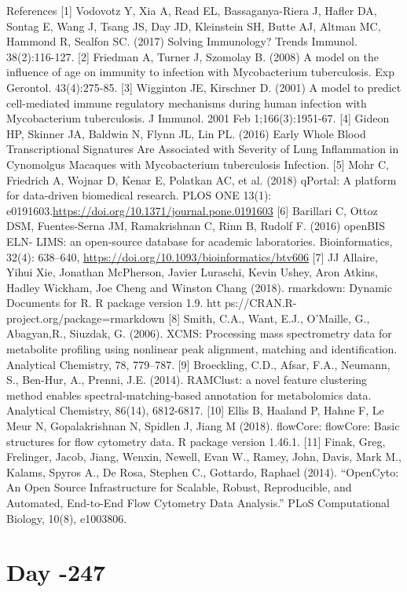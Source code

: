\documentclass[]{book}
\begin{document}
References {[}1{]} Vodovotz Y, Xia A, Read EL, Bassaganya-Riera J,
Hafler DA, Sontag E, Wang J, Tsang JS, Day JD, Kleinstein SH, Butte AJ,
Altman MC, Hammond R, Sealfon SC. (2017) Solving Immunology? Trends
Immunol. 38(2):116-127. {[}2{]} Friedman A, Turner J, Szomolay B. (2008)
A model on the influence of age on immunity to infection with
Mycobacterium tuberculosis. Exp Gerontol. 43(4):275-85. {[}3{]}
Wigginton JE, Kirschner D. (2001) A model to predict cell-mediated
immune regulatory mechanisms during human infection with Mycobacterium
tuberculosis. J Immunol. 2001 Feb 1;166(3):1951-67. {[}4{]} Gideon HP,
Skinner JA, Baldwin N, Flynn JL, Lin PL. (2016) Early Whole Blood
Transcriptional Signatures Are Associated with Severity of Lung
Inflammation in Cynomolgus Macaques with Mycobacterium tuberculosis
Infection. {[}5{]} Mohr C, Friedrich A, Wojnar D, Kenar E, Polatkan AC,
et al. (2018) qPortal: A platform for data-driven biomedical research.
PLOS ONE 13(1):
e0191603.\url{https://doi.org/10.1371/journal.pone.0191603} {[}6{]}
Barillari C, Ottoz DSM, Fuentes-Serna JM, Ramakrishnan C, Rinn B, Rudolf
F. (2016) openBIS ELN- LIMS: an open-source database for academic
laboratories. Bioinformatics, 32(4): 638--640,
\url{https://doi.org/10.1093/bioinformatics/btv606} {[}7{]} JJ Allaire,
Yihui Xie, Jonathan McPherson, Javier Luraschi, Kevin Ushey, Aron
Atkins, Hadley Wickham, Joe Cheng and Winston Chang (2018). rmarkdown:
Dynamic Documents for R. R package version 1.9. htt
ps://CRAN.R-project.org/package=rmarkdown {[}8{]} Smith, C.A., Want,
E.J., O'Maille, G., Abagyan,R., Siuzdak, G. (2006). XCMS: Processing
mass spectrometry data for metabolite profiling using nonlinear peak
alignment, matching and identification. Analytical Chemistry, 78,
779--787. {[}9{]} Broeckling, C.D., Afsar, F.A., Neumann, S., Ben-Hur,
A., Prenni, J.E. (2014). RAMClust: a novel feature clustering method
enables spectral-matching-based annotation for metabolomics data.
Analytical Chemistry, 86(14), 6812-6817. {[}10{]} Ellis B, Haaland P,
Hahne F, Le Meur N, Gopalakrishnan N, Spidlen J, Jiang M (2018).
flowCore: flowCore: Basic structures for flow cytometry data. R package
version 1.46.1. {[}11{]} Finak, Greg, Frelinger, Jacob, Jiang, Wenxin,
Newell, Evan W., Ramey, John, Davis, Mark M., Kalams, Spyros A., De
Rosa, Stephen C., Gottardo, Raphael (2014). ``OpenCyto: An Open Source
Infrastructure for Scalable, Robust, Reproducible, and Automated,
End-to-End Flow Cytometry Data Analysis.'' PLoS Computational Biology,
10(8), e1003806.

\chapter{Day -247}\label{day--247}
\end{document}
